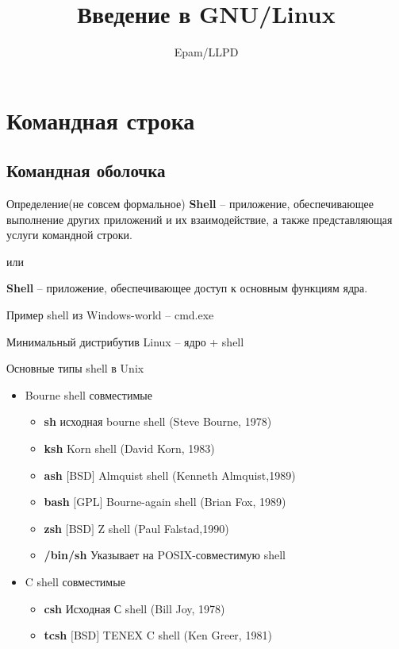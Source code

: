 \documentclass[ignorenonframetext, professionalfonts, hyperref={unicode}]{beamer}
\title{Введение в GNU/Linux}
\author{Epam/LLPD}
\begin{document}
\section{Командная строка}


\frame{
	\frametitle{}
	\titlepage
	\vspace{-0.5cm}
	\begin{center}
	\end{center}
}
\frame{
	\tableofcontents
}

\subsection{Командная оболочка}
\begin{frame}[fragile]{Определение(не совсем формальное)}
\textbf{Shell} -- приложение, обеспечивающее выполнение других приложений и их взаимодействие, а также представляющая услуги командной строки. 
\begin{center}
  или
\end{center}
\textbf{Shell} -- приложение, обеспечивающее доступ к основным функциям ядра.

\pause
\vspace{0.5in}
Пример shell из Windows-world -- cmd.exe
\vspace{0.5in}

Минимальный дистрибутив Linux -- ядро + shell 

\end{frame}
\begin{frame}[fragile]{Основные типы shell в Unix}
  \begin{itemize}
    \item Bourne shell совместимые
      \begin{itemize}
        \item \textbf{sh} исходная bourne shell (Steve Bourne, 1978)
        \item \textbf{ksh} Korn shell (David Korn, 1983)
        \item \textbf{ash} $[$BSD$]$ Almquist shell (Kenneth Almquist,1989)  
        \item \textbf{bash} $[$GPL$]$ Bourne-again shell (Brian Fox, 1989)
        \item \textbf{zsh} $[$BSD$]$ Z shell (Paul Falstad,1990)
        \item \textbf{/bin/sh} Указывает на POSIX-совместимую shell
      \end{itemize}
  \item C shell совместимые
      \begin{itemize}
        \item \textbf{csh}  Исходная С shell (Bill Joy, 1978)
        \item \textbf{tcsh} $[$BSD$]$ TENEX C shell (Ken Greer, 1981)
       \end{itemize}
  \end{itemize}
\end{frame}
\end{document}
